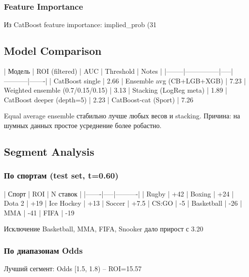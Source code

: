 \documentclass[12pt,a4paper]{article}
\begin{document}
\subsubsection{Feature Importance}
Из CatBoost feature importance: implied_prob (31%

\subsection{Model Comparison}

| Модель | ROI (filtered) | AUC | Threshold | Notes |
|--------|---------------|-----|-----------|-------|
| CatBoost single | 2.66%
| Ensemble avg (CB+LGB+XGB) | 7.23%
| Weighted ensemble (0.7/0.15/0.15) | 3.13%
| Stacking (LogReg meta) | 1.89%
| CatBoost deeper (depth=5) | 2.23%
| CatBoost-cat (Sport) | 7.26%

Equal average ensemble стабильно лучше любых весов и stacking. Причина: на шумных данных простое усреднение более робастно.

\subsection{Segment Analysis}

\subsubsection{По спортам (test set, t=0.60)}
| Спорт | ROI | N ставок |
|-------|-----|----------|
| Rugby | +42%
| Boxing | +24%
| Dota 2 | +19%
| Ice Hockey | +13%
| Soccer | +7.5%
| CS:GO | -5%
| Basketball | -26%
| MMA | -41%
| FIFA | -19%

Исключение Basketball, MMA, FIFA, Snooker дало прирост с 3.20%

\subsubsection{По диапазонам Odds}
Лучший сегмент: Odds [1.5, 1.8) -- ROI=15.57%
\end{document}
